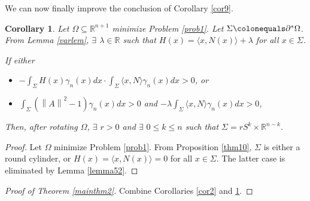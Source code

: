 \documentclass[12pt,reqno]{amsart}
\newtheorem{cor}[theorem]{Corollary}
\theoremstyle{definition}
\renewcommand{\subset}{\subseteq}
\newcommand{\vnormt}[1]{\left\|#1\right\|}    %
\newcommand{\R}{\mathbb{R}}
\newcommand{\redA}{\partial^{*}\Omega}
\newcommand{\sdimn}{n}
\newcommand{\adimn}{n+1}
\newcommand{\scon}{\lambda}
\begin{document}
%
%
%

We can now finally improve the conclusion of Corollary \ref{cor9}.

\begin{cor}\label{cor10}
Let $\Omega\subset\R^{\adimn}$ minimize Problem \ref{prob1}.  Let $\Sigma\colonequals\redA$.  From Lemma \ref{varlem}, $\exists$ $\scon\in\R$ such that $H(x)=\langle x,N(x)\rangle+\scon$ for all $x\in\Sigma$.

If either
\begin{itemize}
\item[(i)] $-\int_{\Sigma} H(x)\gamma_{\sdimn}(x)dx\cdot \int_{\Sigma}\langle x,N\rangle\gamma_{\sdimn}(x)dx>0$, or
\item[(ii)] $\int_{\Sigma}(\vnormt{A}^{2}-1)\gamma_{\sdimn}(x)dx>0$ and $-\scon\int_{\Sigma}\langle x,N\rangle\gamma_{\sdimn}(x)dx>0$,
\end{itemize}
Then, after rotating $\Omega$, $\exists$ $r>0$ and $\exists$ $0\leq k\leq\sdimn$ such that $\Sigma=rS^{k}\times\R^{\sdimn-k}$.
\end{cor}
\begin{proof}
Let $\Omega$ minimize Problem \ref{prob1}.  From Proposition \ref{thm10}, $\Sigma$ is either a round cylinder, or $H(x)=\langle x,N(x)\rangle=0$ for all $x\in\Sigma$.  The latter case is eliminated by Lemma \ref{lemma52}.
\end{proof}

\begin{proof}[Proof of Theorem \ref{mainthm2}]
Combine Corollaries \ref{cor2} and \ref{cor10}.
\end{proof}
\end{document}
